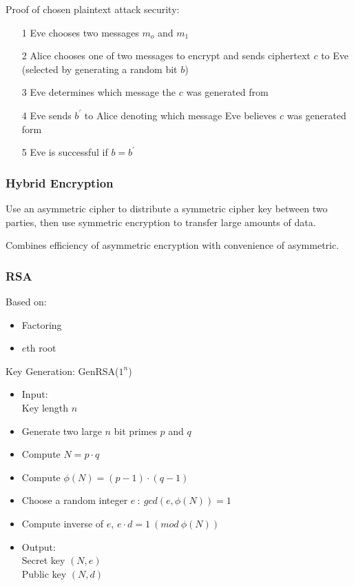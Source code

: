 \documentclass[a4paper]{article}
\begin{document}
Proof of chosen plaintext attack security:
\begin{enumerate}
  \item[1] Eve chooses two messages $m_{o}$ and $m_{1}$
  \item[2] Alice chooses one of two messages to encrypt and sends ciphertext $c$
           to Eve (selected by generating a random bit $b$)
  \item[3] Eve determines which message the $c$ was generated from
  \item[4] Eve sends $b^{\prime}$ to Alice denoting which message Eve believes
           $c$ was generated form
  \item[5] Eve is successful if $b = b^{\prime}$
\end{enumerate}

\subsubsection{Hybrid Encryption}

Use an asymmetric cipher to distribute a symmetric cipher key between two
parties, then use symmetric encryption to transfer large amounts of data.

Combines efficiency of asymmetric encryption with convenience of asymmetric.

\subsubsection{RSA}
\label{sec:rsa_encryption}

Based on:
\begin{itemize}
  \item Factoring
  \item $e$th root
\end{itemize}

Key Generation: GenRSA($1^{n}$)
\begin{itemize}
  \item
    Input: \\
    Key length $n$
  \item Generate two large $n$ bit primes $p$ and $q$
  \item Compute $N = p \cdot q$
  \item Compute $\phi(N) = (p - 1) \cdot (q - 1)$
  \item Choose a random integer $e \: : \: gcd(e, \phi(N)) = 1$
  \item Compute inverse of $e$, $e \cdot d = 1 \: (mod \: \phi(N))$
  \item
    Output: \\
    Secret key $(N, e)$ \\
    Public key $(N, d)$
\end{itemize}
\end{document}
